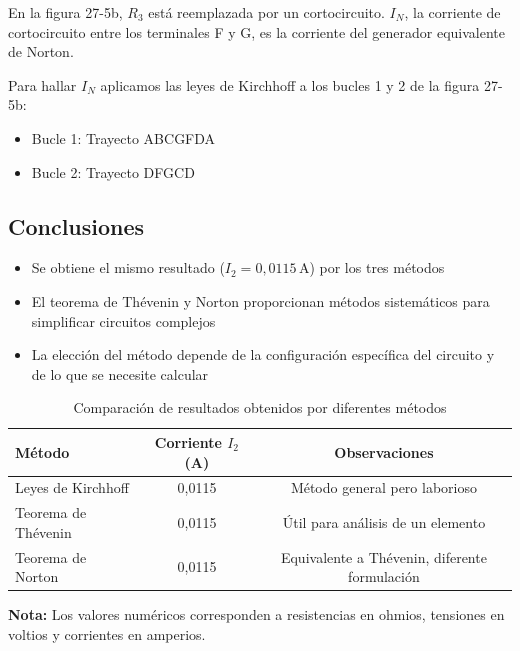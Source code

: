 En la figura 27-5b, $R_3$ está reemplazada por un cortocircuito. $I_N$, la corriente de cortocircuito entre los terminales F y G, es la corriente del generador equivalente de Norton.

Para hallar $I_N$ aplicamos las leyes de Kirchhoff a los bucles 1 y 2 de la figura 27-5b:
\begin{itemize}
    \item Bucle 1: Trayecto ABCGFDA
    \item Bucle 2: Trayecto DFGCD
\end{itemize}

\subsection{Conclusiones}
\begin{itemize}
    \item Se obtiene el mismo resultado ($I_2 = 0,0115 \, \text{A}$) por los tres métodos
    \item El teorema de Thévenin y Norton proporcionan métodos sistemáticos para simplificar circuitos complejos
    \item La elección del método depende de la configuración específica del circuito y de lo que se necesite calcular
\end{itemize}

\begin{table}[H]
    \centering
    \caption{Comparación de resultados obtenidos por diferentes métodos}
    \label{tab:comparacion_metodos}
    \begin{tabular}{lcc}
        \toprule
        \textbf{Método} & \textbf{Corriente $I_2$ (A)} & \textbf{Observaciones} \\
        \midrule
        Leyes de Kirchhoff & 0,0115 & Método general pero laborioso \\
        Teorema de Thévenin & 0,0115 & Útil para análisis de un elemento \\
        Teorema de Norton & 0,0115 & Equivalente a Thévenin, diferente formulación \\
        \bottomrule
    \end{tabular}
\end{table}

\textbf{Nota:} Los valores numéricos corresponden a resistencias en ohmios, tensiones en voltios y corrientes en amperios.